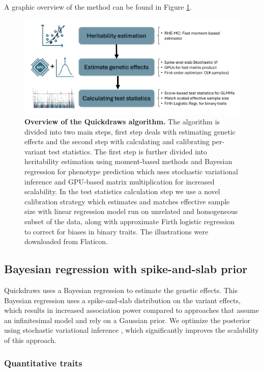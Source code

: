 A graphic overview of the method can be found in Figure \ref{fig:qd_overview}.

\begin{figure}
    \centering
    \includegraphics[width=\linewidth]{figures/thesis_qd_overview.pdf}
    \caption{\textbf{Overview of the Quickdraws algorithm.} The algorithm is divided into two main steps, first step deals with estimating genetic effects and the second step with calculating and calibrating per-variant test statistics. The first step is further divided into heritability estimation using moment-based methods \cite{zhu2024ARGRHE} and Bayesian regression for phenotype prediction which uses stochastic variational inference and GPU-based matrix multiplication for increased scalability. In the test statistics calculation step we use a novel calibration strategy which estimates and matches effective sample size with linear regression model run on unrelated and homogeneous subset of the data, along with approximate Firth logistic regression to correct for biases in binary traits. The illustrations were downloaded from Flaticon.}
    \label{fig:qd_overview}
\end{figure}

\subsection{Bayesian regression with spike-and-slab prior }
\label{sec:ch4-blr}
%
Quickdraws uses a Bayesian regression to estimate the genetic effects.
%
This Bayesian regression uses a spike-and-slab distribution on the variant effects, which results in increased association power compared to approaches that assume an infinitesimal model and rely on a Gaussian prior.
%
We optimize the posterior using stochastic variational inference \cite{hoffman2013stochastic}, which significantly improves the scalability of this approach.
%

\subsubsection{Quantitative traits}

